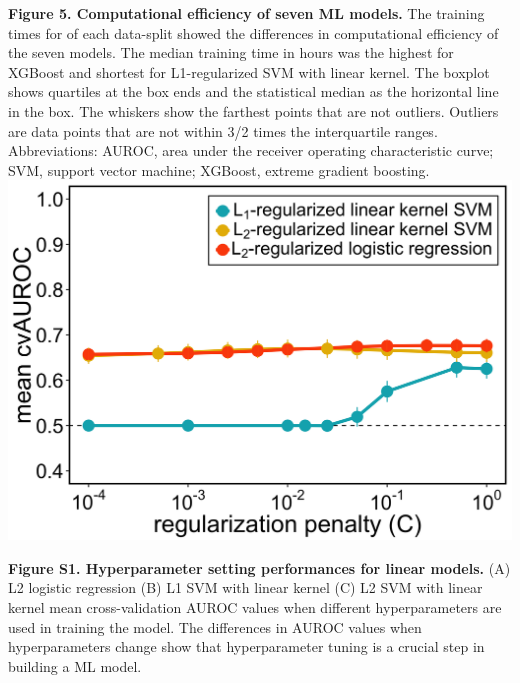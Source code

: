 \documentclass[11pt,]{article}
\begin{document}
\textbf{Figure 5. Computational efficiency of seven ML models.} The
training times for of each data-split showed the differences in
computational efficiency of the seven models. The median training time
in hours was the highest for XGBoost and shortest for L1-regularized SVM
with linear kernel. The boxplot shows quartiles at the box ends and the
statistical median as the horizontal line in the box. The whiskers show
the farthest points that are not outliers. Outliers are data points that
are not within 3/2 times the interquartile ranges. Abbreviations: AUROC,
area under the receiver operating characteristic curve; SVM, support
vector machine; XGBoost, extreme gradient boosting. \newpage
\includegraphics{Figure_S1.png}

\textbf{Figure S1. Hyperparameter setting performances for linear
models.} (A) L2 logistic regression (B) L1 SVM with linear kernel (C) L2
SVM with linear kernel mean cross-validation AUROC values when different
hyperparameters are used in training the model. The differences in AUROC
values when hyperparameters change show that hyperparameter tuning is a
crucial step in building a ML model.

\newpage
\end{document}
